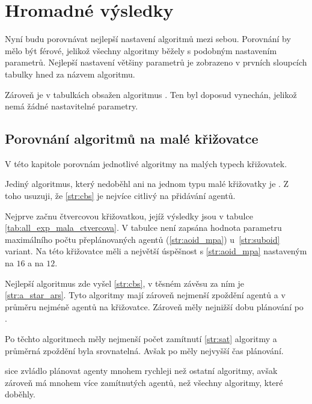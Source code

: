 \section{Hromadné výsledky}\label{sec:hromadne_vysledky}

%

Nyní budu porovnávat nejlepší nastavení algoritmů mezi sebou.
Porovnání by mělo být férové, jelikož všechny algoritmy běžely s podobným nastavením parametrů.
Nejlepší nastavení většiny parametrů je zobrazeno v prvních sloupcích tabulky hned za názvem algoritmu.

Zároveň je v tabulkách obsažen algoritmus .
Ten byl doposud vynechán, jelikož nemá žádné nastavitelné parametry.

\subsection{Porovnání algoritmů na malé křižovatce}\label{subsec:porovnani_algoritmu_na_male_krizovatce}

V této kapitole porovnám jednotlivé algoritmy na malých typech křižovatek.

Jediný algoritmus, který nedoběhl ani na jednom typu malé křižovatky je .
Z toho usuzuji, že \ref{str:cbs} je nejvíce citlivý na přidávání agentů.


Nejprve začnu čtvercovou křižovatkou, jejíž výsledky jsou v tabulce \ref{tab:all_exp_mala_ctvercova}.
V tabulce není zapsána hodnota parametru maximálního počtu přeplánovaných agentů (\ref{str:aoid_mpa}) u~\ref{str:suboid} variant.
Na této křižovatce měli  a 
největší úspěšnost s \ref{str:aoid_mpa} nastaveným na $16$ a  na $12$.

Nejlepší algoritmus zde vyšel \ref{str:cbs}, v těsném závěsu za ním je \ref{str:a_star_ars}.
Tyto algoritmy mají zároveň nejmenší zpoždění agentů a v průměru nejméně agentů na křižovatce.
Zároveň měly nejnižší dobu plánování po .

Po těchto algoritmech měly nejmenší počet zamítnutí \ref{str:sat} algoritmy a průměrná zpoždění byla srovnatelná.
Avšak po  měly nejvyšší čas plánování.

 sice zvládlo plánovat agenty mnohem rychleji než ostatní algoritmy,
avšak zároveň má mnohem více zamítnutých agentů, než všechny algoritmy, které doběhly.

